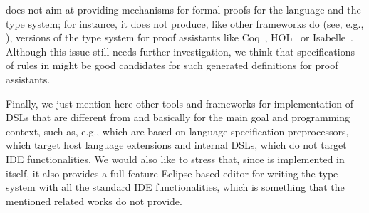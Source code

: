 \xtypes{} does not aim at providing mechanisms for formal proofs for the
language and the type system; for instance, it does not produce, like other
frameworks do (see, e.g., \cite{Ott}), versions of the type system for proof
assistants like Coq~\cite{Coq}, HOL~\cite{HOL} or Isabelle~\cite{Isabelle}.
Although this issue still needs further investigation, we think that
specifications of rules in \xtypes{} might be good candidates for such generated
definitions for proof assistants.

Finally, we just mention here other tools and frameworks for implementation of
DSLs that are different from \xtext{} and \xtypes{} basically for the main goal
and programming context, such as, e.g., \cite{JST98,MetaBorg06,MontiCore10}
which are based on language specification preprocessors,
\cite{XMF08,LanguageBoxes09} which target host language extensions and internal
DSLs, \cite{ASFSDF,Ruler,PLTRedex} which do not target IDE functionalities. We
would also like to stress that, since \xtypes{} is implemented in \xtext{}
itself, it also provides a full feature Eclipse-based editor for writing the
type system with all the standard IDE functionalities, which is something that
the mentioned related works do not provide.
